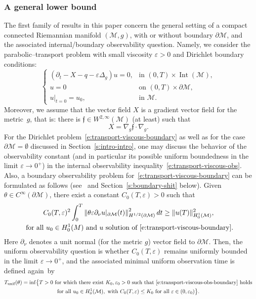 \documentclass[10pt]{amsart}
\newcommand{\unif}{\textup{unif}}
\theoremstyle{definition}
\newcommand{\M}{\ensuremath{\mathcal M}}
\newcommand{\f}{\ensuremath{\mathfrak{f}}}
\DeclareMathOperator{\Int}{Int}
\newcommand\nor[2]{\left\|#1\right\|_{#2}}
\let\d\partial
\let\eps\varepsilon
\let\q q
\begin{document}
\subsubsection{A general lower bound}
\label{s:sect-general}
The first family of results in this paper concern the general setting of a compact connected Riemannian manifold $(\M,g)$, with or without boundary $\d\M$, and the associated internal/boundary observability question. Namely, we consider the parabolic--transport problem with small viscosity $\eps>0$ and Dirichlet boundary conditions:
\begin{equation}
\label{e:transport-viscous-boundary}
\begin{cases}
(\d_t - X -\q - \eps \Delta_g ) u = 0, & \text{in } (0,T)\times\Int(\M), \\
u = 0 & \text{on } (0,T)\times \d\M, \\
u|_{t=0} = u_0, & \text{in } \M.
\end{cases}
\end{equation}
Moreover, we assume that the vector field $X$ is a gradient vector field for the metric~$g$, that is: there is $\f \in W^{2,\infty}(\M)$ (at least) such that
\[
X = \nabla_g \f \cdot \nabla_g.
\]
For the Dirichlet problem~\eqref{e:transport-viscous-boundary} as well as for the case $\d\M =\emptyset$ discussed in Section~\ref{s:intro-intro}, one may discuss the behavior of the observability constant (and in particular its possible uniform boundedness in the limit $\eps\to 0^+$) in the internal observability inequality~\eqref{e:transport-viscous-obs}.
Also, a boundary observability problem for~\eqref{e:transport-viscous-boundary} can be formulated as follows (see~\cite{GL:07} and Section~\ref{s:boundary-shit} below). Given $\theta \in C^\infty(\d\M)$, there exist a constant $C_0(T,\eps)>0$ such that
\begin{multline}
\label{e:transport-viscous-obs-boundary}
C_0(T,\eps)^2 \int_0^T\nor{ \theta \eps \d_{\nu} u|_{\d\M}(t)}{H^{1/2}(\d\M)}^2 dt \geq \|u (T)\|_{H^1_0(\M)}^2, \\
\text{ for all } u_0 \in H^1_0(M) \text{ and } u \text{ solution of~\eqref{e:transport-viscous-boundary}}.
\end{multline}
Here $\d_\nu$ denotes a unit normal (for the metric $g$) vector field to $\d\M$.
Then, the uniform observability question is whether $C_0(T,\eps)$ remains uniformly bounded in the limit $\eps\to 0^+$, and the associated minimal uniform observation time is defined again~by
\begin{multline*}
T_{\unif}(\theta) = \inf \bigl\{ T >0 \text{ for which there exist }K_0, \eps_0>0 \text{ such that~\eqref{e:transport-viscous-obs-boundary} holds}\\
\text {for all }u_0\in H^1_0(\M), \text{ with }C_0(T,\eps)\leq K_0 \text{ for all } \eps \in (0,\eps_0) \bigr\}.
\end{multline*}
\end{document}
